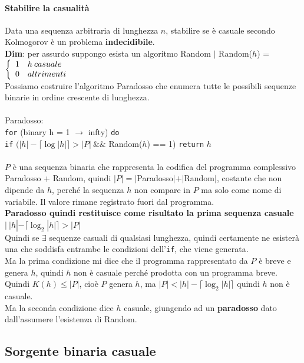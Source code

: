 \documentclass[10pt]{book}
\begin{document}
\paragraph{Stabilire la casualità} Data una sequenza arbitraria di lunghezza $n$, stabilire se è casuale secondo Kolmogorov è un problema \textbf{indecidibile}.\\
\textbf{Dim}: per assurdo suppongo esista un algoritmo Random $|$ Random($h$) = $\left\{\begin{array}{l l}
1 & h\:casuale\\
0 & altrimenti
\end{array}\right.$ \\
Possiamo costruire l'algoritmo Paradosso che enumera tutte le possibili sequenze binarie in ordine crescente di lunghezza.\\\\
Paradosso:\\\texttt{for} (binary h = 1 $\to$ infty) \texttt{do}\\
\texttt{if} $(|h| - \lceil\log |h|\rceil > |P|\:\&\&$ Random($h$) == 1) \texttt{return} $h$\\\\
$P$ è una sequenza binaria che rappresenta la codifica del programma complessivo Paradosso + Random, quindi $|P| = |$Paradosso$| + |$Random$|$, costante che non dipende da $h$, perché la sequenza $h$ non compare in $P$ ma solo come nome di variabile. Il valore rimane registrato fuori dal programma.\\
\textbf{Paradosso quindi restituisce come risultato la prima sequenza casuale} $|\:|h| - \lceil\log_2 |h|\rceil > |P|$\\
Quindi se $\exists$ sequenze casuali di qualsiasi lunghezza, quindi certamente ne esisterà una che soddisfa entrambe le condizioni dell'\texttt{if}, che viene generata.\\
Ma la prima condizione mi dice che il programma rappresentato da $P$ è breve e genera $h$, quindi $h$ non è casuale perché prodotta con un programma breve.\\
Quindi $K(h) \leq |P|$, cioè $P$ genera $h$, ma $|P| < |h| - \lceil\log_2|h|\rceil$ quindi $h$ non è casuale.\\
Ma la seconda condizione dice $h$ casuale, giungendo ad un \textbf{paradosso} dato dall'assumere l'esistenza di Random.
\subsection{Sorgente binaria casuale}
\end{document}
